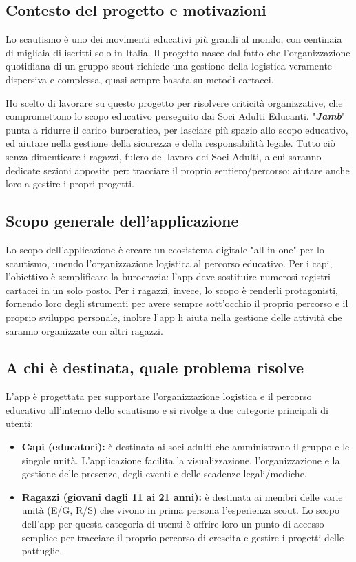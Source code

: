 \documentclass[11pt]{article}
\numberwithin{figure}{section}
\begin{document}
\subsection{Contesto del progetto e motivazioni}
Lo scautismo è uno dei movimenti educativi più grandi al mondo, con centinaia di migliaia di iscritti solo in Italia. Il progetto nasce dal fatto che l'organizzazione quotidiana di un gruppo scout richiede una gestione della logistica veramente dispersiva e complessa, quasi sempre basata su metodi cartacei.

Ho scelto di lavorare su questo progetto per risolvere criticità organizzative, che compromettono lo scopo educativo perseguito dai Soci Adulti Educanti. "\textbf{\textit{Jamb}}" punta a ridurre il carico burocratico, per lasciare più spazio allo scopo educativo, ed aiutare nella gestione della sicurezza e della responsabilità legale. Tutto ciò senza dimenticare i ragazzi, fulcro del lavoro dei Soci Adulti, a cui saranno dedicate sezioni apposite per: tracciare il proprio sentiero/percorso; aiutare anche loro a gestire i propri progetti.


\subsection{Scopo generale dell'applicazione}
Lo scopo dell'applicazione è creare un ecosistema digitale "all-in-one" per lo scautismo, unendo l'organizzazione logistica al percorso educativo. Per i capi, l'obiettivo è semplificare la burocrazia: l'app deve sostituire numerosi registri cartacei in un solo posto. Per i ragazzi, invece, lo scopo è renderli protagonisti, fornendo loro degli strumenti per avere sempre sott'occhio il proprio percorso e il proprio sviluppo personale, inoltre l'app li aiuta nella gestione delle attività che saranno organizzate con altri ragazzi.

\subsection{A chi è destinata, quale problema risolve}
L'app è progettata per supportare l'organizzazione logistica e il percorso educativo all'interno dello scautismo e si rivolge a due categorie principali di utenti:
\begin{itemize}[topsep=0.5pt]
  \item \textbf{Capi (educatori):} è destinata ai soci adulti che amministrano il gruppo e le singole unità. L'applicazione facilita la visualizzazione, l'organizzazione e la gestione delle presenze, degli eventi e delle scadenze legali/mediche.
  \item \textbf{Ragazzi (giovani dagli 11 ai 21 anni):} è destinata ai membri delle varie unità (E/G, R/S) che vivono in prima persona l'esperienza scout. Lo scopo dell'app per questa categoria di utenti è offrire loro un punto di accesso semplice per tracciare il proprio percorso di crescita e gestire i progetti delle pattuglie.
\end{itemize}
\end{document}
